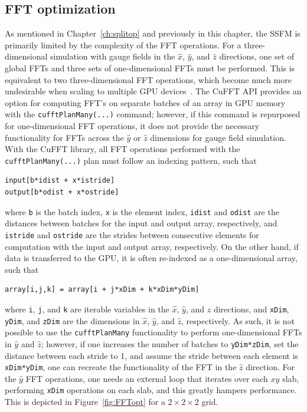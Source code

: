 \subsection{FFT optimization}

As mentioned in Chapter~\ref{ch:splitop} and previously in this chapter, the SSFM is primarily limited by the complexity of the FFT operations.
For a three-dimensional simulation with gauge fields in the $\hat x$, $\hat y$, and $\hat z$ directions, one set of global FFTs and three sets of one-dimensional FFTs must be performed.
This is equivalent to two three-dimensional FFT operations, which become much more undesirable when scaling to multiple GPU devices~\cite{czechowski2012}.
The CuFFT API provides an option for computing FFT's on separate batches of an array in GPU memory with the \texttt{cufftPlanMany(...)} command; however, if this command is repurposed for one-dimensional FFT operations, it does not provide the necessary functionality for FFTs across the $\hat y$ or $\hat z$ dimensions for gauge field simulation.
With the CuFFT library, all FFT operations performed with the \texttt{cufftPlanMany(...)} plan must follow an indexing pattern, such that 

\begin{lstlisting}
input[b*idist + x*istride]
output[b*odist + x*ostride]
\end{lstlisting}

\noindent where \texttt{b} is the batch index, \texttt{x} is the element index, \texttt{idist} and \texttt{odist} are the distances between batches for the input and output array, respectively, and \texttt{istride} and \texttt{ostride} are the strides between consecutive elements for computation with the input and output array, respectively.
On the other hand, if data is transferred to the GPU, it is often re-indexed as a one-dimensional array, such that

\begin{lstlisting}
array[i,j,k] = array[i + j*xDim + k*xDim*yDim]
\end{lstlisting}

\noindent where \texttt{i}, \texttt{j}, and \texttt{k} are iterable variables in the $\hat x$, $\hat y$, and $\hat z$ directions, and \texttt{xDim}, \texttt{yDim}, and \texttt{zDim} are the dimensions in $\hat x$, $\hat y$, and $\hat z$, respectively.
As such, it is not possible to use the \texttt{cufftPlanMany} functionality to perform one-dimensional FFTs in $\hat y$ and $\hat z$; however, if one increases the number of batches to \texttt{yDim*zDim}, set the distance between each stride to 1, and assume the stride between each element is \texttt{xDim*yDim}, one can recreate the functionality of the FFT in the $\hat z$ direction.
For the $\hat y$ FFT operations, one needs an external loop that iterates over each $xy$ slab, performing \texttt{xDim} operations on each slab, and this greatly hampers performance.
This is depicted in Figure~\ref{fig:FFTopt} for a $2\times 2\times 2$ grid.

